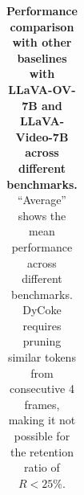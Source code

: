 \begin{table}[!t]
{\begin{tabular}{lcccccccc}
    \end{tabular}%
    }
    \vspace{-2mm}
    \caption{\textbf{Performance comparison with other baselines with LLaVA-OV-7B and LLaVA-Video-7B across different benchmarks.} ``Average'' shows the mean performance across different benchmarks. 
    DyCoke requires pruning similar tokens from consecutive 4 frames, making it not possible for the retention ratio of $R<25\%$.
    }
    \vspace{-5mm}
  \label{tab:main_results}%
\end{table}%